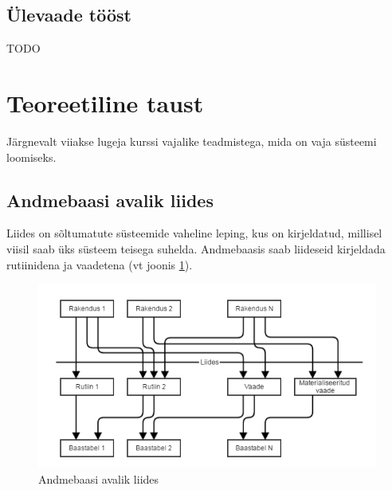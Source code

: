 \documentclass[a4paper,12pt]{article} %
\begin{document}
\subsection{Ülevaade tööst}
TODO
\pagebreak

\section{Teoreetiline taust}
Järgnevalt viiakse lugeja kurssi vajalike teadmistega, mida on vaja süsteemi loomiseks.

\subsection{Andmebaasi avalik liides}
\label{andmebaasi_avalik_liides}
Liides on sõltumatute süsteemide vaheline leping, kus on kirjeldatud, millisel viisil saab üks süsteem teisega suhelda.
Andmebaasis saab liideseid kirjeldada rutiinidena ja vaadetena (vt joonis \ref{fig_andmebaasi_avalik_liides}).

\begin{figure}[H]
\begin{center}
\includegraphics[bb=0 0 606 330,scale=0.6]{./diagrams/db-interface.png}
\caption{Andmebaasi avalik liides}
\label{fig_andmebaasi_avalik_liides}
\end{center}
\end{figure}
\end{document}
